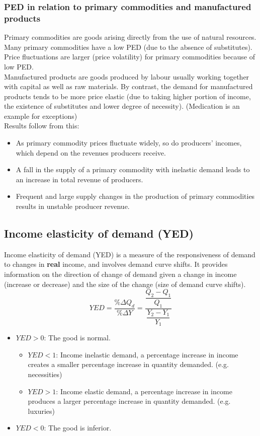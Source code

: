 \documentclass[a4paper,12pt]{article}
\begin{document}
\subsubsection*{PED in relation to primary commodities and manufactured products}
Primary commodities are goods arising directly from the use of natural resources. Many primary commodities have a low PED (due to the absence of substitutes). Price fluctuations are larger (price volatility) for primary commodities because of low PED.\\
Manufactured products are goods produced by labour usually working together with capital as well as raw materials. By contrast, the demand for manufactured products tends to be more price elastic (due to taking higher portion of income, the existence of substitutes and lower degree of necessity). (Medication is an example for exceptions)\\
Results follow from this:
\begin{itemize}
  \item As primary commodity prices fluctuate widely, so do producers' incomes, which depend on the revenues producers receive.
  \item A fall in the supply of a primary commodity with inelastic demand leads to an increase in total revenue of producers.
  \item Frequent and large supply changes in the production of primary commodities results in unstable producer revenue.
\end{itemize}
\subsection{Income elasticity of demand (YED)}
Income elasticity of demand (YED) is a measure of the responsiveness of demand to changes
in \textbf{real} income, and involves demand curve shifts. It provides information on the direction of change of demand given a change in income (increase or decrease) and the size of the change (size of demand curve shifts).
\[YED=\dfrac{\%\Delta Q_d}{\%\Delta Y}=\dfrac{\dfrac{Q_2-Q_1}{Q_1}}{\dfrac{Y_2-Y_1}{Y_1}}\]
\begin{itemize}
  \item $YED>0$: The good is normal.
  \begin{itemize}
    \item $YED<1$: Income inelastic demand, a percentage increase in income creates a smaller percentage increase in quantity demanded. (e.g. necessities)
    \item $YED>1$: Income elastic demand, a percentage increase in income produces a larger percentage increase in quantity demanded. (e.g. luxuries)
  \end{itemize}
  \item $YED<0$: The good is inferior.
\end{itemize}
\end{document}
